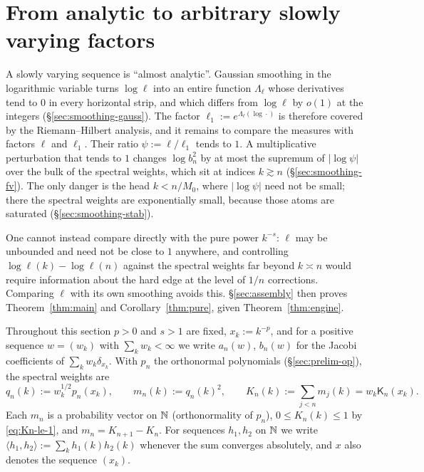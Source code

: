\providecommand{\Ath}[1]{\textup{(A$_{#1}$)}}

\section{From analytic to arbitrary slowly varying factors}\label{sec:smoothing}

A slowly varying sequence is ``almost analytic''. Gaussian smoothing in the logarithmic variable turns $\log\ell$ into
an entire function $\Lambda_\ell$ whose derivatives tend to $0$ in every horizontal strip, and which differs from
$\log\ell$ by $o(1)$ at the integers (\S\ref{sec:smoothing-gauss}). The factor $\ell_1:=e^{\Lambda_\ell(\log\cdot)}$ is
therefore covered by the Riemann--Hilbert analysis, and it remains to compare the measures with factors $\ell$ and
$\ell_1$. Their ratio $\psi:=\ell/\ell_1$ tends to $1$. A multiplicative perturbation that tends to $1$ changes
$\log b_n^2$ by at most the supremum of $|\log\psi|$ over the bulk of the spectral weights, which sit at indices
$k\gtrsim n$ (\S\ref{sec:smoothing-fv}). The only danger is the head $k<n/M_0$, where $|\log\psi|$ need not be small;
there the spectral weights are exponentially small, because those atoms are saturated (\S\ref{sec:smoothing-stab}).

One cannot instead compare directly with the pure power $k^{-s}$: $\ell$ may be unbounded and need not be close to
$1$ anywhere, and controlling $\log\ell(k)-\log\ell(n)$ against the spectral weights far beyond $k\asymp n$ would require
information about the hard edge at the level of $1/n$ corrections. Comparing $\ell$ with its own smoothing avoids this.
\S\ref{sec:assembly} then proves Theorem~\ref{thm:main} and Corollary~\ref{thm:pure}, given Theorem~\ref{thm:engine}.

Throughout this section $p>0$ and $s>1$ are fixed, $x_k:=k^{-p}$, and for a positive sequence $w=(w_k)$ with
$\sum_kw_k<\infty$ we write $a_n(w)$, $b_n(w)$ for the Jacobi coefficients of $\sum_kw_k\delta_{x_k}$. With $p_n$ the
orthonormal polynomials (\S\ref{sec:prelim-op}), the spectral weights are
\[
  q_n(k):=w_k^{1/2}p_n(x_k),\qquad m_n(k):=q_n(k)^2,\qquad K_n(k):=\sum_{j<n}m_j(k)=w_k\mathsf K_n(x_k).
\]
Each $m_n$ is a probability vector on $\mathbb{N}$ (orthonormality of $p_n$), $0\le K_n(k)\le1$ by \eqref{eq:Kn-le-1}, and
$m_n=K_{n+1}-K_n$. For sequences $h_1,h_2$ on $\mathbb{N}$ we write $\langle h_1,h_2\rangle:=\sum_kh_1(k)h_2(k)$ whenever the sum converges
absolutely, and $x$ also denotes the sequence $(x_k)$.

